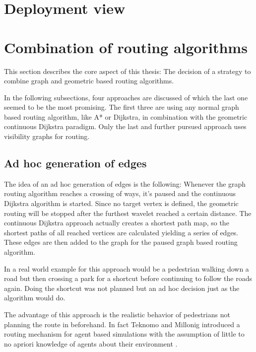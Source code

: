 \section{Deployment view}


\section{Combination of routing algorithms}

	This section describes the core aspect of this thesis:
	The decision of a strategy to combine graph and geometric based routing algorithms.
	
	In the following subsections, four approaches are discussed of which the last one seemed to be the most promising.
	The first three are using any normal graph based routing algorithm, like A* or Dijkstra, in combination with the geometric continuous Dijkstra paradigm.
	Only the last and further pursued approach uses visibility graphs for routing.
	
	\subsection{Ad hoc generation of edges}
	
		The idea of an ad hoc generation of edges is the following:
		Whenever the graph routing algorithm reaches a crossing of ways, it's paused and the continuous Dijkstra algorithm is started.
		Since no target vertex is defined, the geometric routing will be stopped after the furthest wavelet reached a certain distance.
		The continuous Dijkstra approach actually creates a shortest path map, so the shortest paths of all reached vertices are calculated yielding a series of edges.
		These edges are then added to the graph for the paused graph based routing algorithm.
		
		In a real world example for this approach would be a pedestrian walking down a road but then crossing a park for a shortcut before continuing to follow the roads again.
		Doing the shortcut was not planned but an ad hoc decision just as the algorithm would do.
		
		The advantage of this approach is the realistic behavior of pedestrians not planning the route in beforehand.
		In fact Teknomo and Millonig introduced a routing mechanism for agent based simulations with the assumption of little to no apriori knowledge of agents about their environment \cite{teknomo-millonig-routing}.
		
